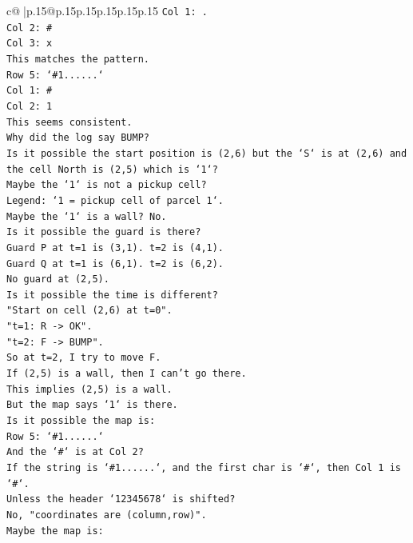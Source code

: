 \documentclass{article}
\begin{document}
{\begin{supertabular}{c@{$\;$}|p{.15\linewidth}@{}p{.15\linewidth}p{.15\linewidth}p{.15\linewidth}p{.15\linewidth}p{.15\linewidth}}
{{{\texttt{Col 1: .} \\
\texttt{Col 2: \#} \\
\texttt{Col 3: x} \\
\texttt{This matches the pattern.} \\
\texttt{Row 5: `\#1......`} \\
\texttt{Col 1: \#} \\
\texttt{Col 2: 1} \\
\texttt{This seems consistent.} \\
\texttt{Why did the log say BUMP?} \\
\texttt{Is it possible the start position is (2,6) but the `S` is at (2,6) and the cell North is (2,5) which is `1`?} \\
\texttt{Maybe the `1` is not a pickup cell?} \\
\texttt{Legend: `1 = pickup cell of parcel 1`.} \\
\texttt{Maybe the `1` is a wall? No.} \\
\texttt{Is it possible the guard is there?} \\
\texttt{Guard P at t=1 is (3,1). t=2 is (4,1).} \\
\texttt{Guard Q at t=1 is (6,1). t=2 is (6,2).} \\
\texttt{No guard at (2,5).} \\
\texttt{Is it possible the time is different?} \\
\texttt{"Start on cell (2,6) at t=0".} \\
\texttt{"t=1: R {-}> OK".} \\
\texttt{"t=2: F {-}> BUMP".} \\
\texttt{So at t=2, I try to move F.} \\
\texttt{If (2,5) is a wall, then I can't go there.} \\
\texttt{This implies (2,5) is a wall.} \\
\texttt{But the map says `1` is there.} \\
\texttt{Is it possible the map is:} \\
\texttt{Row 5: `\#1......`} \\
\texttt{And the `\#` is at Col 2?} \\
\texttt{If the string is `\#1......`, and the first char is `\#`, then Col 1 is `\#`.} \\
\texttt{Unless the header `12345678` is shifted?} \\
\texttt{No, "coordinates are (column,row)".} \\
\texttt{Maybe the map is:} \\
}}}
\end{supertabular}}
\end{document}
